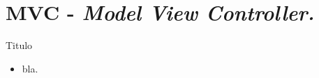 \section{MVC - \emph{Model View Controller.}}
\begin{frame}{Titulo}
\begin{block}{}
	\begin{itemize}
		\item bla.
	\end{itemize}
\end{block}
\end{frame}



%
